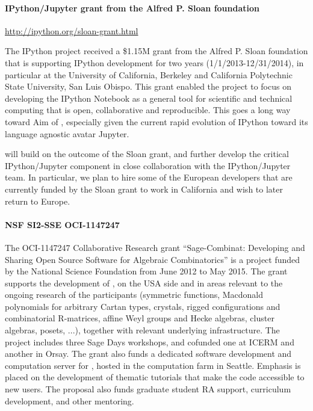 \paragraph{IPython/Jupyter grant from the Alfred P. Sloan foundation}
\url{http://ipython.org/sloan-grant.html}


The IPython project received a \$1.15M grant from the Alfred P. Sloan
foundation that is supporting IPython development for two years
(1/1/2013-12/31/2014), in particular at the University of California,
Berkeley and California Polytechnic State University, San Luis Obispo.
This grant enabled the project to focus on developing the IPython
Notebook as a general tool for scientific and technical computing that
is open, collaborative and reproducible. This goes a long way toward
Aim  of \TheProject, especially given the current
rapid evolution of IPython toward its language agnostic avatar
Jupyter.

\TheProject will build on the outcome of the Sloan grant, and further
develop the critical IPython/Jupyter component in close collaboration
with the IPython/Jupyter team. In particular, we plan to hire some of
the European developers that are currently funded by the Sloan grant
to work in California and wish to later return to Europe.

\paragraph{NSF SI2-SSE OCI-1147247}


The OCI-1147247 Collaborative Research grant ``Sage-Combinat:
Developing and Sharing Open Source Software for Algebraic
Combinatorics'' is a project funded by the National Science Foundation
from June 2012 to May 2015. The grant supports the development of
\SageCombinat, on the USA side and in areas relevant to the ongoing
research of the participants (symmetric functions, Macdonald
polynomials for arbitrary Cartan types, crystals, rigged
configurations and combinatorial R-matrices, affine Weyl groups and
Hecke algebras, cluster algebras, posets, ...), together with relevant
underlying infrastructure. The project includes three Sage Days
workshops, and cofunded one at ICERM and another in Orsay. The grant
also funds a dedicated software development and computation server for
\SageCombinat, hosted in the \Sage computation farm in
Seattle. Emphasis is placed on the development of thematic tutorials
that make the code accessible to new users. The proposal also funds
graduate student RA support, curriculum development, and other
mentoring.

